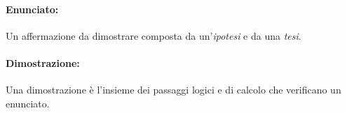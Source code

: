         \paragraph{Enunciato:\\ }
            Un affermazione  da dimostrare composta da un'\textit{ipotesi} e da una \textit{tesi}.
        \hfill \break
        \paragraph{Dimostrazione:\\ }
            Una dimostrazione è l'insieme dei passaggi logici e di calcolo che verificano un enunciato.
        